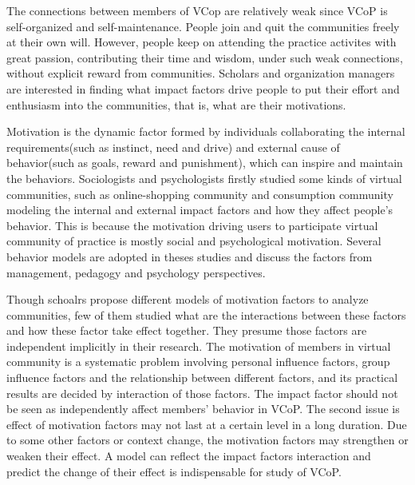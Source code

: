 \documentclass{elsarticle}
\begin{document}
The connections between members of  VCop are relatively weak since VCoP is
self-organized and self-maintenance. People join and quit the
communities freely at their own will. However, people keep on
attending the practice activites with great passion, contributing
their time and wisdom, under such weak
connections, without explicit reward from communities. Scholars and
organization managers are interested in finding what impact factors drive
people to put their effort and enthusiasm into the communities,
that is, what are their motivations.

Motivation is the dynamic factor formed by individuals collaborating the internal requirements(such as instinct, need and drive) and external cause of behavior(such as goals, reward and punishment), which can inspire and maintain the behaviors.
Sociologists and psychologists firstly studied some kinds of virtual
communities, such as online-shopping community and consumption community
modeling the internal and external impact factors and how they affect
people's behavior\cite{teo1999iae}\cite{shang2005evi}. This is because
the motivation  driving users to participate virtual community of
practice is mostly social and  psychological  motivation. Several
behavior  models
are adopted in theses studies and discuss the factors from management,
pedagogy and psychology perspectives\cite{Hsiu-FenLin04012007}\cite{bul-125-6-62719991101}\cite{Kuowiley2008}\cite{1631336620050301}\cite{Beecham2008}.

Though schoalrs propose different models of   motivation  factors to analyze communities, few of them studied
what are the interactions between these factors and how these factor
take effect together. They presume those factors are independent
implicitly in their research. The motivation of members in virtual community is
a systematic problem involving personal influence factors, group
influence factors and the relationship between different factors, and
its practical results are decided by interaction of those factors. The
impact factor should not be seen as independently affect members'
behavior in VCoP. The second issue is  effect of motivation factors
may not last at a certain level in a
long duration. Due to some other factors or context change, the
motivation factors may strengthen or weaken their effect.  A model can
reflect   the impact factors interaction and
predict the change of their effect is indispensable for study of
VCoP. 
\end{document}
